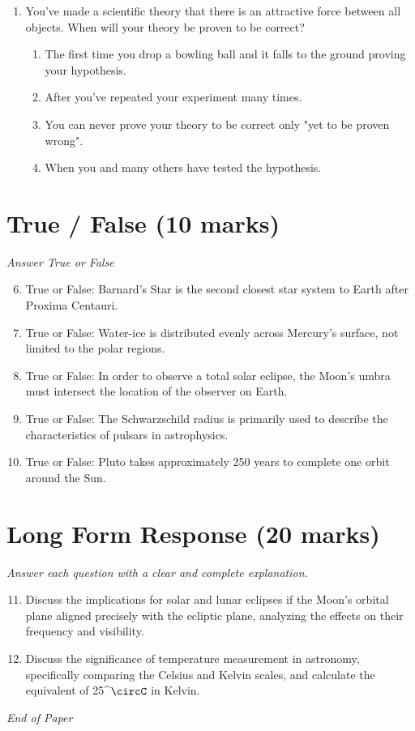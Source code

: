\documentclass[12pt]{article}
\begin{document}
\begin{enumerate}[label=\arabic*.]
\begin{enumerate}[label=(\alph*)]
    \item Titan's atmosphere is composed mostly of hydrocarbons
    \item A and D
\end{enumerate}
\item You've made a scientific theory that there is an attractive force between all objects. When will your theory be proven to be correct?
\begin{enumerate}[label=(\alph*)]
    \item The first time you drop a bowling ball and it falls to the ground proving your hypothesis.
    \item After you've repeated your experiment many times.
    \item You can never prove your theory to be correct only "yet to be proven wrong".
    \item When you and many others have tested the hypothesis.
\end{enumerate}
\end{enumerate}

\section*{True / False (10 marks)}
\textit{Answer True or False}
\begin{enumerate}[label=\arabic*.]
\setcounter{enumi}{5}
\item True or False: Barnard's Star is the second closest star system to Earth after Proxima Centauri.
\item True or False: Water-ice is distributed evenly across Mercury's surface, not limited to the polar regions.
\item True or False: In order to observe a total solar eclipse, the Moon's umbra must intersect the location of the observer on Earth.
\item True or False: The Schwarzschild radius is primarily used to describe the characteristics of pulsars in astrophysics.
\item True or False: Pluto takes approximately 250 years to complete one orbit around the Sun.
\end{enumerate}

\section*{Long Form Response (20 marks)}
\textit{Answer each question with a clear and complete explanation.}
\begin{enumerate}[label=\arabic*.]
\setcounter{enumi}{10}
\item Discuss the implications for solar and lunar eclipses if the Moon's orbital plane aligned precisely with the ecliptic plane, analyzing the effects on their frequency and visibility.
\item Discuss the significance of temperature measurement in astronomy, specifically comparing the Celsius and Kelvin scales, and calculate the equivalent of 25^\ensuremath{\circC} in Kelvin.
\end{enumerate}

\vfill
\noindent\textit{End of Paper}
\end{document}
